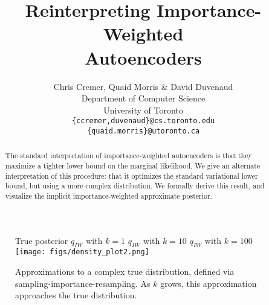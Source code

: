 \documentclass{article} %
\title{Reinterpreting Importance-Weighted \\Autoencoders}
\author{Chris Cremer, Quaid Morris \& David Duvenaud \\
Department of Computer Science\\
University of Toronto\\
\texttt{\{ccremer,duvenaud\}@cs.toronto.edu} \\
\texttt{\{quaid.morris\}@utoronto.ca}
}
\begin{document}
\maketitle

\begin{abstract}
The standard interpretation of importance-weighted autoencoders is that they maximize a tighter lower bound on the marginal likelihood.
We give an alternate interpretation of this procedure: that it optimizes the standard variational lower bound, but using a more complex distribution. 
We formally derive this result, and visualize the implicit importance-weighted approximate posterior.
\end{abstract}
 

\begin{figure}[b]
  \centering
  True posterior \qquad $q_{IW}$ with $k=1$  \qquad $q_{IW}$ with $k=10$  \qquad $q_{IW}$ with $k=100$
      \texttt{[image: figs/density\_plot2.png]}
  \caption{Approximations to a complex true distribution, defined via sampling-importance-resampling. As $k$ grows, this approximation approaches the true distribution.}
  \label{viz1}
\end{figure}
\end{document}
